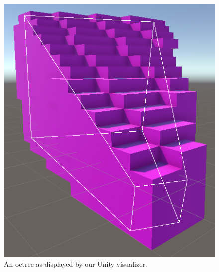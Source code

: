 \documentclass{PoliMi_MasterThesis}
\begin{document}
\begin{figure}[]
    \centering
    \includegraphics[width=\textwidth*\real{0.4}]{Images/octree_visualizer.png}
    \caption{An octree as displayed by our Unity visualizer.}
    \label{fig:octree_intro}
\end{figure}
\end{document}
